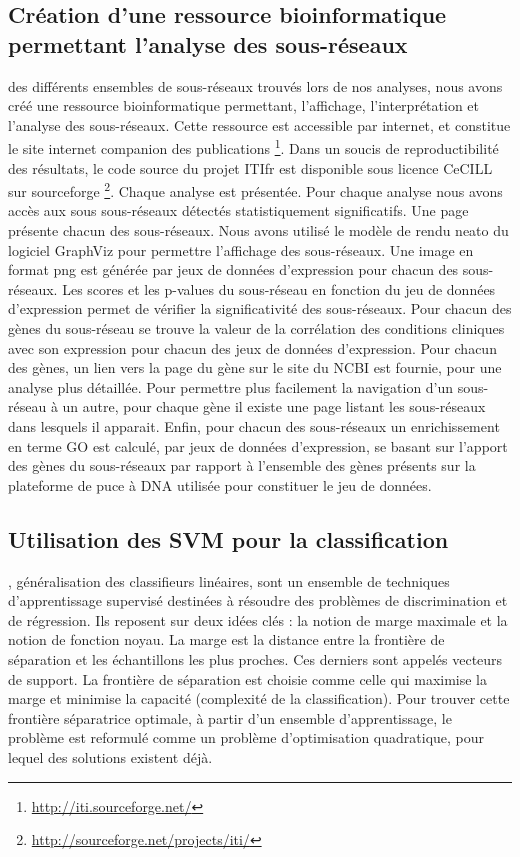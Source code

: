 		\subsection{\textcolor{green!45!black}{Création d'une ressource bioinformatique permettant l'analyse des sous-réseaux}}
			 des différents ensembles de sous-réseaux trouvés lors de nos analyses, nous avons créé une ressource bioinformatique permettant, l'affichage, l'interprétation et l'analyse des sous-réseaux.
			Cette ressource est accessible par internet, et constitue le site internet companion des publications \footnote{\url{http://iti.sourceforge.net/}}.
			Dans un soucis de reproductibilité des résultats, le code source du projet \ac{ITIfr} est disponible sous licence CeCILL sur sourceforge \footnote{\url{http://sourceforge.net/projects/iti/}}.
			Chaque analyse est présentée.
			Pour chaque analyse nous avons accès aux sous sous-réseaux détectés statistiquement significatifs.
			Une page présente chacun des sous-réseaux.
			Nous avons utilisé le modèle de rendu neato du logiciel GraphViz pour permettre l'affichage des sous-réseaux.
			Une image en format png est générée par jeux de données d'expression pour chacun des sous-réseaux.
			Les scores et les p-values du sous-réseau en fonction du jeu de données d'expression permet de vérifier la significativité des sous-réseaux.
			Pour chacun des gènes du sous-réseau se trouve la valeur de la corrélation des conditions cliniques avec son expression pour chacun des jeux de données d'expression.
			Pour chacun des gènes, un lien vers la page du gène sur le site du NCBI est fournie, pour une analyse plus détaillée.
			Pour permettre plus facilement la navigation d'un sous-réseau à un autre, pour chaque gène il existe une page listant les sous-réseaux dans lesquels il apparait.
			Enfin, pour chacun des sous-réseaux un enrichissement en terme GO est calculé, par jeux de données d'expression, se basant sur l'apport des gènes du sous-réseaux par rapport à l'ensemble des gènes présents sur la plateforme de puce à \acs{DNA} utilisée pour constituer le jeu de données.

		\subsection{\textcolor{green!45!black}{Utilisation des SVM pour la classification}}\label{sub:classification}

			, généralisation des classifieurs linéaires, sont un ensemble de techniques d'apprentissage supervisé destinées à résoudre des problèmes de discrimination et de régression.
			Ils reposent sur deux idées clés : la notion de marge maximale et la notion de fonction noyau.
			La marge est la distance entre la frontière de séparation et les échantillons les plus proches.
			Ces derniers sont appelés vecteurs de support.
			La frontière de séparation est choisie comme celle qui maximise la marge et minimise la capacité (complexité de la classification).
			Pour trouver cette frontière séparatrice optimale, à partir d'un ensemble d'apprentissage, le problème est reformulé comme un problème d'optimisation quadratique, pour lequel des solutions existent déjà.

